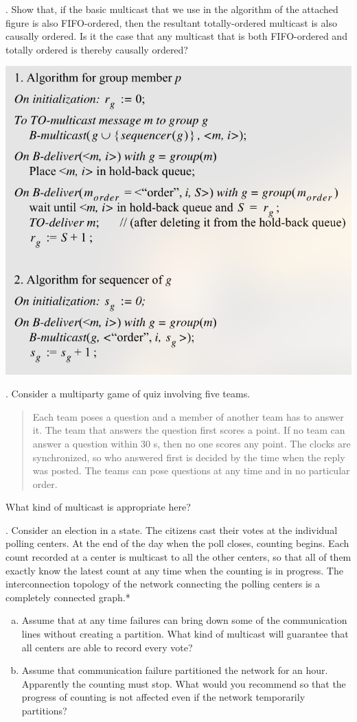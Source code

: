 \documentclass[12pt]{article}
\newcounter{question}
\newcommand{\question}[1]{
    \stepcounter{question}
    \thequestion. #1 \hfill
}
\begin{document}
\question{Show that, if the basic multicast that we use in the algorithm of the attached figure is also FIFO-ordered, then the resultant totally-ordered multicast is also causally ordered. Is it the case that any multicast that is both FIFO-ordered and totally ordered is thereby causally ordered?}

\begin{center}
    \includegraphics[scale=0.70]{multicast.png}
\end{center}

\question{Consider a multiparty game of quiz involving five teams. \begin{quote} Each team poses a question and a member of another team has to answer it. The team that answers the question first scores a point. If no team can answer a question within 30 s, then no one scores any point. The clocks are synchronized, so who answered first is decided by the time when the reply was posted. The teams can pose questions at any time and in no particular order. \end{quote} What kind of multicast is appropriate here?  }


\question{Consider an election in a state. The citizens cast their votes at the individual polling centers. At the end of the day when the poll closes, counting begins. Each count recorded at a center is multicast to all the other centers, so that all of them exactly know the latest count at any time when the counting is in progress. The interconnection topology of the network connecting the polling centers is a completely connected graph.*}

\begin{enumerate}[(a)]
    \item Assume that at any time failures can bring down some of the communication lines without creating a partition. What kind of multicast will guarantee that all centers are able to record every vote?
    \item Assume that communication failure partitioned the network for an hour. Apparently the counting must stop. What  would you recommend so that the progress of counting is not affected even if the network temporarily partitions?
\end{enumerate}
\end{document}
